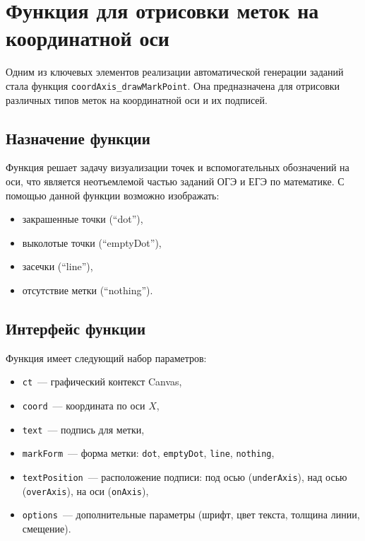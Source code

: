 \section{Функция для отрисовки меток на координатной оси}

Одним из ключевых элементов реализации автоматической генерации заданий
стала функция \texttt{coordAxis\_drawMarkPoint}. Она предназначена для
отрисовки различных типов меток на координатной оси и их подписей.

\subsection{Назначение функции}
Функция решает задачу визуализации точек и вспомогательных обозначений на оси,
что является неотъемлемой частью заданий ОГЭ и ЕГЭ по математике.
С помощью данной функции возможно изображать:
\begin{itemize}
    \item закрашенные точки (``dot''),
    \item выколотые точки (``emptyDot''),
    \item засечки (``line''),
    \item отсутствие метки (``nothing'').
\end{itemize}

\subsection{Интерфейс функции}
Функция имеет следующий набор параметров:
\begin{itemize}
    \item \texttt{ct}~--- графический контекст Canvas,
    \item \texttt{coord}~--- координата по оси $X$,
    \item \texttt{text}~--- подпись для метки,
    \item \texttt{markForm}~--- форма метки: \texttt{dot}, \texttt{emptyDot}, \texttt{line}, \texttt{nothing},
    \item \texttt{textPosition}~--- расположение подписи: под осью (\texttt{underAxis}), над осью (\texttt{overAxis}), на оси (\texttt{onAxis}),
    \item \texttt{options}~--- дополнительные параметры (шрифт, цвет текста, толщина линии, смещение).
\end{itemize}

